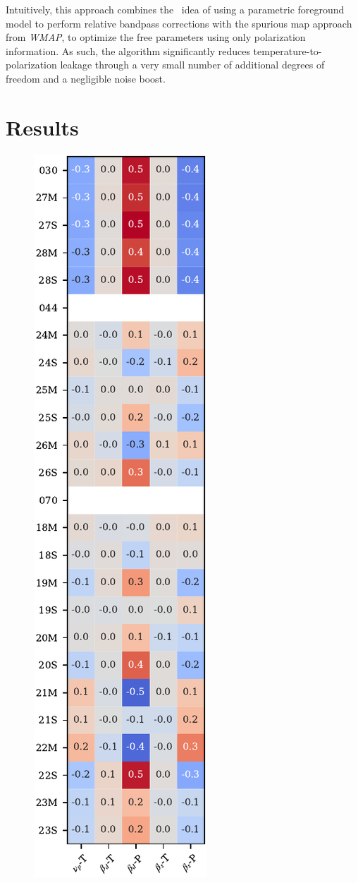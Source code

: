 \documentclass[twocolumn]{aa}
\def\WMAP{\textit{WMAP}}
\newcommand{\?}[1]{\textcolor{red}{{\bf [#1]}}}
\begin{document}
Intuitively, this approach combines the \Planck\ idea of using a
parametric foreground model to perform relative bandpass corrections
with the spurious map approach from \WMAP, to optimize the
free parameters using only polarization information. As such, the
algorithm significantly reduces temperature-to-polarization
leakage through a very small number of additional degrees of freedom
and a negligible noise boost.


\section{Results}
\label{sec:results}

  \begin{figure}[t] %
    \center
    \includegraphics[width=0.4892\linewidth]{figs/corrmat.pdf}

\end{figure}
\end{document}
